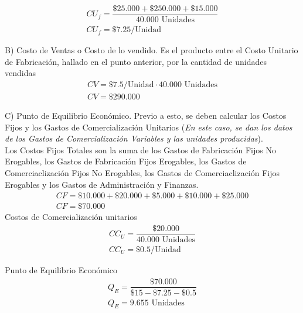 \documentclass[12pt,a4paper]{article}
\begin{document}
            \begin{gather*}
            	{CU}_{f} = \dfrac{ \$25{.}000 + \$250{.}000 + \$15{.}000 }{ 40{.}000 \text{ Unidades} }\\
                {CU}_{f} = \$7.25 / \text{Unidad}
			\end{gather*}
            
		\hrulefill
        
        B) Costo de Ventas o Costo de lo vendido. Es el producto entre el Costo Unitario de Fabricación, hallado en el punto anterior, por la cantidad de unidades vendidas
            \begin{gather*}
            	{CV} = \$7.5 / \text{Unidad} \cdot 40{.}000 \text{ Unidades} \\
                {CV} = \$290{.}000
			\end{gather*}
            
		\hrulefill
        
        C) Punto de Equilibrio Económico. Previo a esto, se deben calcular los Costos Fijos y los Gastos de Comercialización Unitarios (\textsl{En este caso, se dan los datos de los Gastos de Comercialización Variables y las unidades producidas}).\\
        	Los Costos Fijos Totales son la suma de los Gastos de Fabricación Fijos No Erogables, los Gastos de Fabricación Fijos Erogables, los Gastos de Comerciaclización Fijos No Erogables, los Gastos de Comerciaclización Fijos Erogables y los Gastos de Administración y Finanzas.
            \begin{gather*}
            	CF = \$10{.}000 + \$20{.}000 + \$5{.}000 + \$10{.}000 + \$25{.}000 \\
                CF = \$70{.}000
			\end{gather*}
            \newpage
            Costos de Comercialización unitarios
            \begin{gather*}
            	{CC}_{U} = \dfrac{ \$20{.}000 }{ 40{.}000 \text{ Unidades} } \\
                {CC}_{U} = \$0.5 / \text{Unidad}
			\end{gather*}
            
            Punto de Equilibrio Económico
            \begin{gather*}
            	{Q}_{E} = \dfrac{ \$70{.}000 }{ \$15 - \$7.25 - \$0.5 } \\
                {Q}_{E} = 9{.}655 \text{ Unidades}
			\end{gather*}
            
\end{document}

